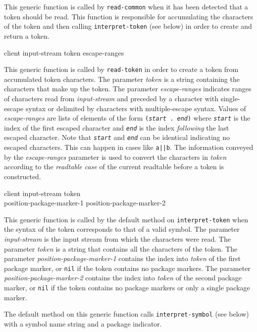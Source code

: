 This generic function is called by \texttt{read-common} when it has
been detected that a token should be read.  This function is
responsible for accumulating the characters of the token and then
calling \texttt{interpret-token} (see below) in order to create and
return a token.

 {client input-stream token escape-ranges}

This generic function is called by \texttt{read-token} in order to
create a token from accumulated token characters.  The parameter
\textit{token} is a string containing the characters that make up the
token.  The parameter \textit{escape-ranges} indicates ranges of
characters read from \textit{input-stream} and preceded by a character
with single-escape syntax or delimited by characters with
multiple-escape syntax.  Values of \textit{escape-ranges} are lists of
elements of the form \texttt{(\textit{start}\ .\ \textit{end})} where
\texttt{\textit{start}} is the index of the first escaped character
and \texttt{\textit{end}} is the index \textit{following} the last
escaped character.  Note that \texttt{\textit{start}} and
\texttt{\textit{end}} can be identical indicating no escaped
characters.  This can happen in cases like \texttt{a||b}.  The
information conveyed by the \textit{escape-ranges} parameter is used
to convert the characters in \textit{token} according to the
\emph{readtable case} of the current readtable before a token is
constructed.

 {client input-stream token \\
  position-package-marker-1 position-package-marker-2}

This generic function is called by the default method on
\texttt{interpret-token} when the syntax of the token corresponds to
that of a valid symbol.  The parameter \textit{input-stream} is the
input stream from which the characters were read.  The parameter
\textit{token} is a string that contains all the characters of the
token.  The parameter \textit{position-package-marker-1} contains the
index into \textit{token} of the first package marker, or \texttt{nil}
if the token contains no package markers.  The parameter
\textit{position-package-marker-2} contains the index into
\textit{token} of the second package marker, or \texttt{nil} if the
token contains no package markers or only a single package marker.

The default method on this generic function calls
\texttt{interpret-symbol} (see below) with a symbol name string and a
package indicator.

